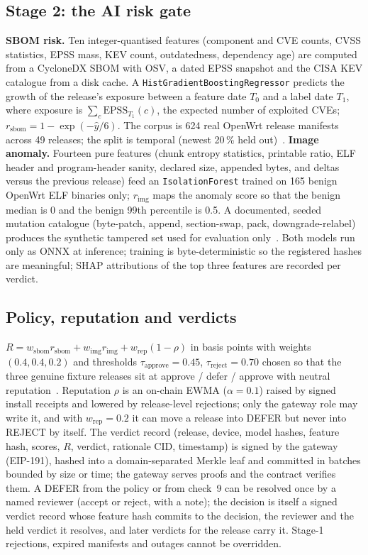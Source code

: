 \documentclass[conference]{IEEEtran}
\begin{document}
\subsection{Stage 2: the AI risk gate}
\textbf{SBOM risk.} Ten integer-quantised features (component and CVE counts, CVSS statistics,
EPSS mass, KEV count, outdatedness, dependency age) are computed from a CycloneDX SBOM with OSV,
a dated EPSS snapshot and the CISA KEV catalogue from a disk cache. A
\texttt{HistGradientBoostingRegressor} predicts the growth of the release's exposure between a
feature date $T_0$ and a label date $T_1$, where exposure is $\sum_{c} \mathrm{EPSS}_{T_1}(c)$,
the expected number of exploited CVEs; $r_\mathrm{sbom} = 1-\exp(-\hat y/6)$. The corpus is 624
real OpenWrt release manifests across 49 releases; the split is temporal (newest 20\,\% held
out)~\cite{card-sbom}.
\textbf{Image anomaly.} Fourteen pure features (chunk entropy statistics, printable ratio, ELF
header and program-header sanity, declared size, appended bytes, and deltas versus the previous
release) feed an \texttt{IsolationForest} trained on 165 benign OpenWrt ELF binaries only;
$r_\mathrm{img}$ maps the anomaly score so that the benign median is 0 and the benign 99th
percentile is 0.5. A documented, seeded mutation catalogue (byte-patch, append, section-swap,
pack, downgrade-relabel) produces the synthetic tampered set used for evaluation
only~\cite{card-img}. Both models run only as ONNX at inference; training is byte-deterministic
so the registered hashes are meaningful; SHAP attributions of the top three features are recorded
per verdict.

\subsection{Policy, reputation and verdicts}
$R = w_\mathrm{sbom} r_\mathrm{sbom} + w_\mathrm{img} r_\mathrm{img} + w_\mathrm{rep}(1-\rho)$
in basis points with weights $(0.4, 0.4, 0.2)$ and thresholds $\tau_\mathrm{approve}=0.45$,
$\tau_\mathrm{reject}=0.70$ chosen so that the three genuine fixture releases sit at approve /
defer / approve with neutral reputation~\cite{adr8}. Reputation $\rho$ is an on-chain EWMA
($\alpha=0.1$) raised by signed install receipts and lowered by release-level rejections; only
the gateway role may write it, and with $w_\mathrm{rep}=0.2$ it can move a release into DEFER but
never into REJECT by itself. The verdict record (release, device, model hashes, feature hash,
scores, $R$, verdict, rationale CID, timestamp) is signed by the gateway (EIP-191), hashed into a
domain-separated Merkle leaf and committed in batches bounded by size or time; the gateway serves
proofs and the contract verifies them. A DEFER from the policy or from check~9 can be resolved
once by a named reviewer (accept or reject, with a note); the decision is itself a signed verdict
record whose feature hash commits to the decision, the reviewer and the held verdict it resolves,
and later verdicts for the release carry it. Stage-1 rejections, expired manifests and outages
cannot be overridden.
\end{document}
